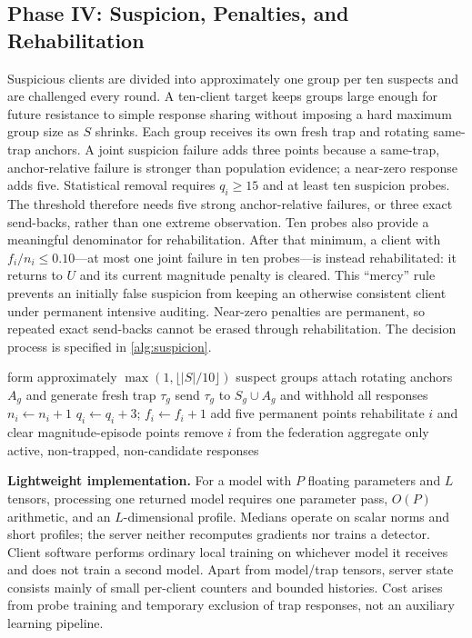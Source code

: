 \documentclass[conference]{IEEEtran}
\begin{document}
\subsection{Phase IV: Suspicion, Penalties, and Rehabilitation}
Suspicious clients are divided into approximately one group per ten suspects and are challenged every round. A ten-client target keeps groups large enough for future resistance to simple response sharing without imposing a hard maximum group size as $S$ shrinks. Each group receives its own fresh trap and rotating same-trap anchors. A joint suspicion failure adds three points because a same-trap, anchor-relative failure is stronger than population evidence; a near-zero response adds five. Statistical removal requires $q_i\geq15$ and at least ten suspicion probes. The threshold therefore needs five strong anchor-relative failures, or three exact send-backs, rather than one extreme observation. Ten probes also provide a meaningful denominator for rehabilitation. After that minimum, a client with $f_i/n_i\leq0.10$---at most one joint failure in ten probes---is instead rehabilitated: it returns to $U$ and its current magnitude penalty is cleared. This ``mercy'' rule prevents an initially false suspicion from keeping an otherwise consistent client under permanent intensive auditing. Near-zero penalties are permanent, so repeated exact send-backs cannot be erased through rehabilitation. The decision process is specified in \autoref{alg:suspicion}.

\begin{algorithm}[t]
\caption{Phase IV: weighted suspicion and decision}
\label{alg:suspicion}
\begin{algorithmic}[1]
\State form approximately $\max(1,\lfloor|S|/10\rfloor)$ suspect groups
 \State attach rotating anchors $A_g$ and generate fresh trap $\tau_g$
 \State send $\tau_g$ to $S_g\cup A_g$ and withhold all responses
   \State $n_i\gets n_i+1$
    \State $q_i\gets q_i+3$; $f_i\gets f_i+1$
   \EndIf
    \State add five permanent points
   \EndIf
     \State rehabilitate $i$ and clear magnitude-episode points
     \State remove $i$ from the federation
   \EndIf
 \EndFor
\EndFor
\State aggregate only active, non-trapped, non-candidate responses
\end{algorithmic}
\end{algorithm}

\medskip\noindent\textbf{Lightweight implementation.}
For a model with $P$ floating parameters and $L$ tensors, processing one returned model requires one parameter pass, $O(P)$ arithmetic, and an $L$-dimensional profile. Medians operate on scalar norms and short profiles; the server neither recomputes gradients nor trains a detector. Client software performs ordinary local training on whichever model it receives and does not train a second model. Apart from model/trap tensors, server state consists mainly of small per-client counters and bounded histories. Cost arises from probe training and temporary exclusion of trap responses, not an auxiliary learning pipeline.
\end{document}
